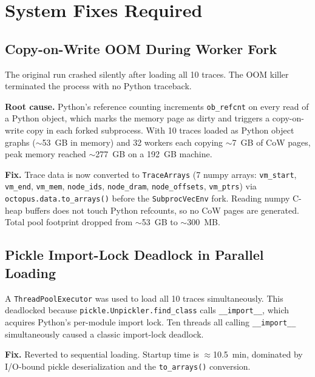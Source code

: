 \documentclass[11pt]{article}
\begin{document}
\section{System Fixes Required}

\subsection{Copy-on-Write OOM During Worker Fork}

The original run crashed silently after loading all 10 traces.
The OOM killer terminated the process with no Python traceback.

\textbf{Root cause.} Python's reference counting increments
\texttt{ob\_refcnt} on every read of a Python object, which marks the
memory page as dirty and triggers a copy-on-write copy in each forked
subprocess. With 10 traces loaded as Python object graphs
($\sim$53~GB in memory) and 32 workers each copying $\sim$7~GB of
CoW pages, peak memory reached $\sim$277~GB on a 192~GB machine.

\textbf{Fix.} Trace data is now converted to \texttt{TraceArrays}
(7 numpy arrays: \texttt{vm\_start}, \texttt{vm\_end}, \texttt{vm\_mem},
\texttt{node\_ids}, \texttt{node\_dram}, \texttt{node\_offsets},
\texttt{vm\_ptrs}) via \texttt{octopus.data.to\_arrays()} before the
\texttt{SubprocVecEnv} fork. Reading numpy C-heap buffers does not
touch Python refcounts, so no CoW pages are generated.
Total pool footprint dropped from $\sim$53~GB to $\sim$300~MB.

\subsection{Pickle Import-Lock Deadlock in Parallel Loading}

A \texttt{ThreadPoolExecutor} was used to load all 10 traces
simultaneously. This deadlocked because \texttt{pickle.Unpickler.find\_class}
calls \texttt{\_\_import\_\_}, which acquires Python's per-module import
lock. Ten threads all calling \texttt{\_\_import\_\_} simultaneously
caused a classic import-lock deadlock.

\textbf{Fix.} Reverted to sequential loading. Startup time is
$\approx$10.5~min, dominated by I/O-bound pickle deserialization and
the \texttt{to\_arrays()} conversion.

\end{document}
